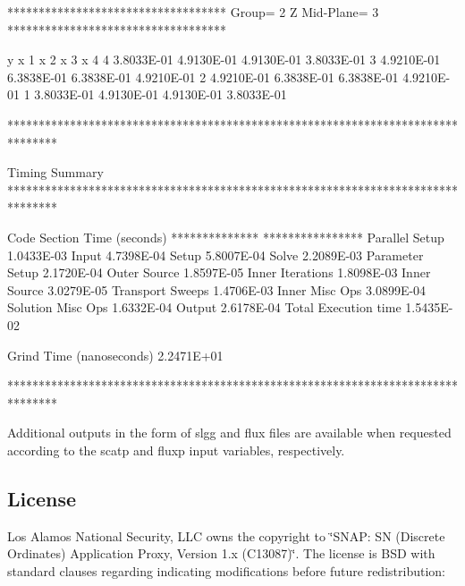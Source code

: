 \begin{DoxyVerb}
 ***********************************
  Group=   2   Z Mid-Plane=    3
 ***********************************

     y    x    1      x    2      x    3      x    4
     4  3.8033E-01  4.9130E-01  4.9130E-01  3.8033E-01
     3  4.9210E-01  6.3838E-01  6.3838E-01  4.9210E-01
     2  4.9210E-01  6.3838E-01  6.3838E-01  4.9210E-01
     1  3.8033E-01  4.9130E-01  4.9130E-01  3.8033E-01

********************************************************************************

          Timing Summary
********************************************************************************

  Code Section                          Time (seconds)
 **************                        ****************
    Parallel Setup                       1.0433E-03
    Input                                4.7398E-04
    Setup                                5.8007E-04
    Solve                                2.2089E-03
       Parameter Setup                   2.1720E-04
       Outer Source                      1.8597E-05
       Inner Iterations                  1.8098E-03
          Inner Source                   3.0279E-05
          Transport Sweeps               1.4706E-03
          Inner Misc Ops                 3.0899E-04
       Solution Misc Ops                 1.6332E-04
    Output                               2.6178E-04
  Total Execution time                   1.5435E-02

  Grind Time (nanoseconds)         2.2471E+01

********************************************************************************
\end{DoxyVerb}


Additional outputs in the form of {\ttfamily slgg} and {\ttfamily flux} files are available when requested according to the {\ttfamily scatp} and {\ttfamily fluxp} input variables, respectively.

\subsection*{License}

Los Alamos National Security, L\-L\-C owns the copyright to \char`\"{}\-S\-N\-A\-P\-: S\-N (\-Discrete Ordinates) Application Proxy, Version 1.\-x (\-C13087)\char`\"{}. The license is B\-S\-D with standard clauses regarding indicating modifications before future redistribution\-:


